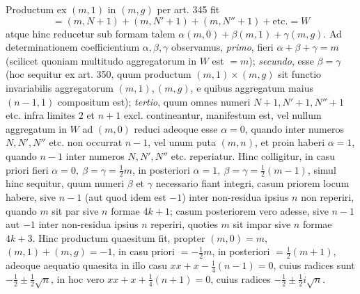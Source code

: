 Productum ex \((m,1)\) in \((m,g)\) per art. 345 fit \[=(m,N+1)+(m,N'+1)+(m,N''+1)+\text{etc.}=W\] atque hinc reducetur sub formam talem \(\alpha(m,0)+\beta(m,1)+\gamma(m,g)\). Ad determinationem coefficientium \(\alpha,\allowbreak \beta,\allowbreak \gamma\) observamus, \textit{primo}, fieri \(\alpha+\beta+\gamma=m\) (scilicet quoniam multitudo aggregatorum in \(W\) est \(=m\)); \textit{secundo}, esse \(\beta=\gamma\) (hoc sequitur ex art. 350, quum productum \((m,1)\times(m,g)\) sit functio invariabilis aggregatorum \((m,1),\allowbreak (m,g)\), e quibus aggregatum maius \((n-1,1)\) compositum est); \textit{tertio}, quum omnes numeri \(N+1,\allowbreak N'+1,\allowbreak N''+1\) etc. infra limites \(2\) et \(n+1\) excl. contineantur, manifestum est, vel nullum aggregatum in \(W\) ad \((m,0)\) reduci adeoque esse \(\alpha=0\), quando inter numeros \(N,\allowbreak N',\allowbreak N''\) etc. non occurrat \(n-1\), vel unum puta \((m,n)\), et proin haberi \(\alpha=1\), quando \(n-1\) inter numeros \(N,\allowbreak N',\allowbreak N''\) etc. reperiatur. Hinc colligitur, in casu priori fieri \(\alpha=0,\allowbreak \ \beta=\gamma=\frac12m\), in posteriori \(\alpha=1,\allowbreak \ \beta=\gamma=\frac12(m-1)\), simul hinc sequitur, quum numeri \(\beta\) et \(\gamma\) necessario fiant integri, casum priorem locum habere, sive \(n-1\) (aut quod idem est \(-1\)) inter non-residua ipsius \(n\) non reperiri, quando \(m\) sit par sive \(n\) formae \(4k+1\); casum posteriorem vero adesse, sive \(n-1\) aut \(-1\) inter non-residua ipsius \(n\) reperiri, quoties \(m\) sit impar sive \(n\) formae \(4k+3\). Hinc productum quaesitum fit, propter \((m,0)=m\), \((m,1)+(m,g)=-1\), in casu priori \(=-\frac12m\), in posteriori \(=\frac12(m+1)\), adeoque aequatio quaesita in illo casu \(xx+x-\frac14(n-1)=0\), cuius radices sunt \(-\frac12\pm\frac12\surd n\), in hoc vero \(xx+x+\frac14(n+1)=0\), cuius radices \(-\frac12\pm\frac12i\surd n\).

